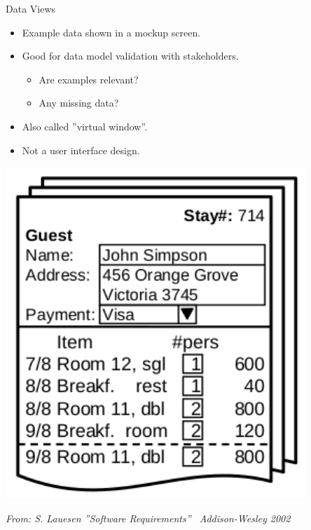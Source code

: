 \begin{Slide}{Data Views}
\begin{minipage}[t]{0.55\textwidth}
\begin{itemize}
\item Example data shown in a mockup screen.
\item Good for data model validation with stakeholders.
\begin{itemize}
\item Are examples relevant?
\item Any missing data?
\end{itemize}
\item Also called ''virtual window''.
\item Not a user interface design.
\end{itemize}
\end{minipage}%
\begin{minipage}[t]{0.45\textwidth}
\vspace{-1.0em}\hfill\includegraphics[width=0.85\textwidth]{../img/virtual-window}

{\hfill\fontsize{4}{4}\itshape\selectfont From: S. Lauesen ''Software Requirements'' \textcopyright~Addison-Wesley 2002}

\end{minipage}
\end{Slide}
